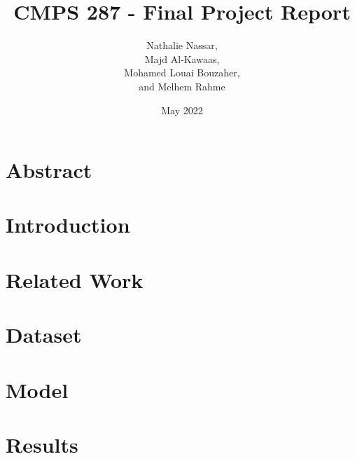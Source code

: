 \documentclass{article}
\title{CMPS 287 - Final Project Report}
\author{Nathalie Nassar, \\Majd Al-Kawaas,\\ Mohamed Louai Bouzaher,\\ and Melhem Rahme}
\date{May 2022}
\begin{document}
\maketitle

\section{Abstract}
\section{Introduction}
\section{Related Work}
\section{Dataset}
\section{Model}
\section{Results}
\end{document}
